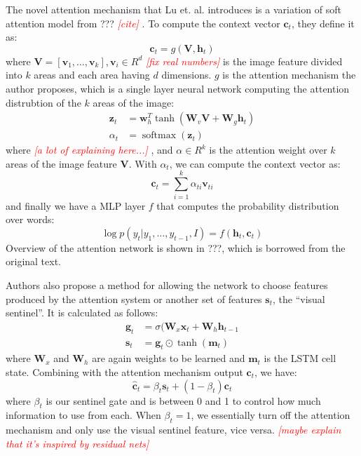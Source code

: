 \documentclass[10pt,twocolumn,letterpaper]{article}
\newcommand{\todo}[1]{\textcolor{red}{{\em [#1]}} }
\newcommand{\matr}[1]{\mathbf{#1}}
\newcommand{\bfit}[1]{\boldsymbol{#1}}
\newcommand{\bs}[1]{\boldsymbol{#1}}
\begin{document}
The novel attention mechanism that Lu et. al. introduces is a variation of
soft attention model from ??? \todo{cite}. To compute the context vector
$\bs{c}_t$, they define it as:
%
\begin{equation}
  \bs{c}_t = g(\matr{V}, \bs{h}_t)
\end{equation}
%
where $\matr{V} = [\mathbf{v}_1,\dots,\mathbf{v}_k], \mathbf{v}_i \in R^d$
\todo{fix real numbers} is the image feature divided into $k$ areas and each
area having $d$ dimensions. $g$ is the attention mechanism the author
proposes, which is a single layer neural network computing the attention
distrubtion of the $k$ areas of the image:
%
\begin{align}
  \matr{z}_t &= \matr{w}_h^T \tanh(\matr{W}_v \matr{V} + \matr{W}_g \matr{h}_t) \\
  \alpha_t   &= \operatorname{softmax}(\matr{z}_t)
\end{align}
%
where \todo{a lot of explaining here...}, and $\alpha \in R^k$ is the
attention weight over $k$ areas of the image feature $\matr{V}$. With
$\alpha_t$, we can compute the context vector as:
%
\begin{equation}
  \bs{c}_t = \sum_{i=1}^k \alpha_{ti} \bs{v}_{ti}
\end{equation}
%
and finally we have a MLP layer $f$ that computes the probability distribution
over words:
%
\begin{equation}
  \log p(y_t | y_1,\dots,y_{t-1},I) = f(\bs{h}_t, \bs{c}_t)
\end{equation}
%
Overview of the attention network is shown in ???, which is borrowed from the
original text.

Authors also propose a method for allowing the network to choose features
produced by the attention system or another set of features
$\bs{s}_t$, the ``visual sentinel''. It is calculated as follows:
%
\begin{align}
  \bs{g}_t &= \sigma (\bfit{W}_x \bs{x}_t + \bfit{W}_h \bs{h}_{t-1} \\
  \bs{s}_t &= \bs{g}_t \odot \tanh (\bs{m}_t)
\end{align}
%
where $\bfit{W}_x$ and $\bfit{W}_h$ are again weights to be learned and
$\bs{m}_t$ is the LSTM cell state. Combining with the attention
mechanism output $\bs{c}_t$, we have:
%
\begin{equation}
  \hat{\bs{c}}_t = \beta_t \bs{s}_t + (1 - \beta_t) \bs{c}_t
\end{equation}
%
where $\beta_t$ is our sentinel gate and is between 0 and 1 to control how
much information to use from each. When $\beta_t=1$, we essentially turn
off the attention mechanism and only use the visual sentinel feature, vice
versa. \todo{maybe explain that it's inspired by residual nets}
\end{document}
